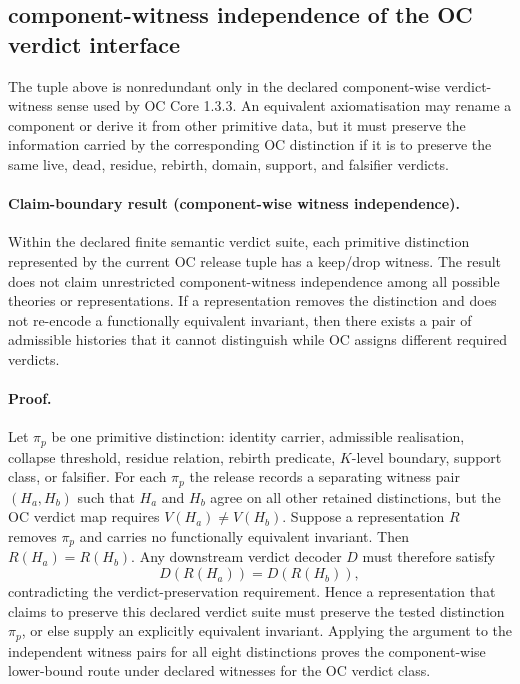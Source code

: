\subsection{component-witness independence of the OC verdict interface}
\label{sec:oc13-global-verdict-minimality}

The tuple above is nonredundant only in the declared component-wise verdict-witness sense used by OC Core 1.3.3. An
equivalent axiomatisation may rename a component or derive it from other
primitive data, but it must preserve the information carried by the
corresponding OC distinction if it is to preserve the same live, dead, residue,
rebirth, domain, support, and falsifier verdicts.

\paragraph{Claim-boundary result (component-wise witness independence).}
Within the declared finite semantic verdict suite, each primitive distinction represented by the current OC release tuple has a keep/drop witness. The result does not claim unrestricted component-witness independence among all possible theories or representations. If a representation removes the distinction and does
not re-encode a functionally equivalent invariant, then there exists a pair of
admissible histories that it cannot distinguish while OC assigns different
required verdicts.

\paragraph{Proof.}
Let \(\pi_p\) be one primitive distinction: identity carrier, admissible
realisation, collapse threshold, residue relation, rebirth predicate,
\(K\)-level boundary, support class, or falsifier. For each \(\pi_p\) the
release records a separating witness pair \((H_a,H_b)\) such that \(H_a\) and
\(H_b\) agree on all other retained distinctions, but the OC verdict map
requires \(V(H_a)\neq V(H_b)\). Suppose a representation \(R\) removes
\(\pi_p\) and carries no functionally equivalent invariant. Then
\(R(H_a)=R(H_b)\). Any downstream verdict decoder \(D\) must therefore satisfy
\[
    D(R(H_a))=D(R(H_b)),
\]
contradicting the verdict-preservation requirement. Hence a representation that claims to preserve this declared verdict suite must preserve the tested distinction \(\pi_p\), or else supply an explicitly equivalent invariant. Applying the argument to the independent witness pairs for all
eight distinctions proves the component-wise lower-bound route under declared witnesses for the OC verdict class.

